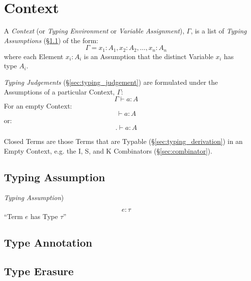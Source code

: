 \section{Context}\label{sec:type_context}

A \emph{Context} (or \emph{Typing Environment} or \emph{Variable
  Assignment}), $\Gamma$, is a list of \emph{Typing Assumptions}
(\S\ref{sec:typing_assumption}) of the form:
\[
  \Gamma = x_1 : A_1, x_2 : A_2, \ldots, x_n : A_n
\]
where each Element $x_i : A_i$ is an Assumption that the distinct
Variable $x_i$ has type $A_i$.

\emph{Typing Judgements} (\S\ref{sec:typing_judgement}) are formulated
under the Assumptions of a particular Context, $\Gamma$:
\[
  \Gamma \vdash a : A
\]
For an empty Context:
\[
  \vdash a : A
\]
or:
\[
  . \vdash a : A
\]

Closed Terms are those Terms that are Typable
(\S\ref{sec:typing_derivation}) in an Empty Context, e.g. the I, S,
and K Combinators (\S\ref{sec:combinator}).



\subsection{Typing Assumption}\label{sec:typing_assumption}

\emph{Typing Assumption})

\[
  e : \tau
\]
``Term $e$ has Type $\tau$''



\subsection{Type Annotation}\label{sec:type_annotation}

\subsection{Type Erasure}\label{sec:type_erasure}

